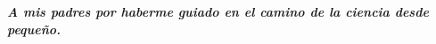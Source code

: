 \vspace*{1.5in}
\begin{flushright}
		\begin{minipage}[b]{5in}
				\Large\bfseries\emph{A mis padres por haberme guiado en el camino de la ciencia desde peque\~no.}
		\end{minipage}
\end{flushright}


